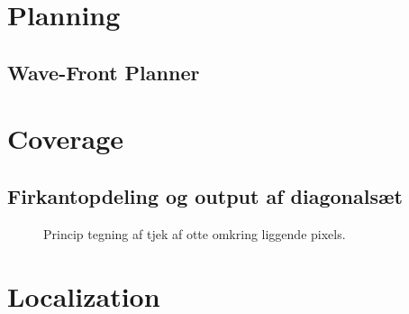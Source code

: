 \appendices
\section{Planning}
\subsection{Wave-Front Planner}
\label{app:wave}


\newpage
\section{Coverage}
\subsection{Firkantopdeling og output af diagonalsæt}
\label{app:firkant}

\begin{figure}[!th]
\centering
\begin{tikzpicture}[scale=0.95]

\end{tikzpicture}
\caption[tekst i indholdsfortegnelsen]{Princip tegning af tjek af otte omkring liggende pixels.}
\label{fig:principotte}
\end{figure}
\newpage



\newpage
\section{Localization}
